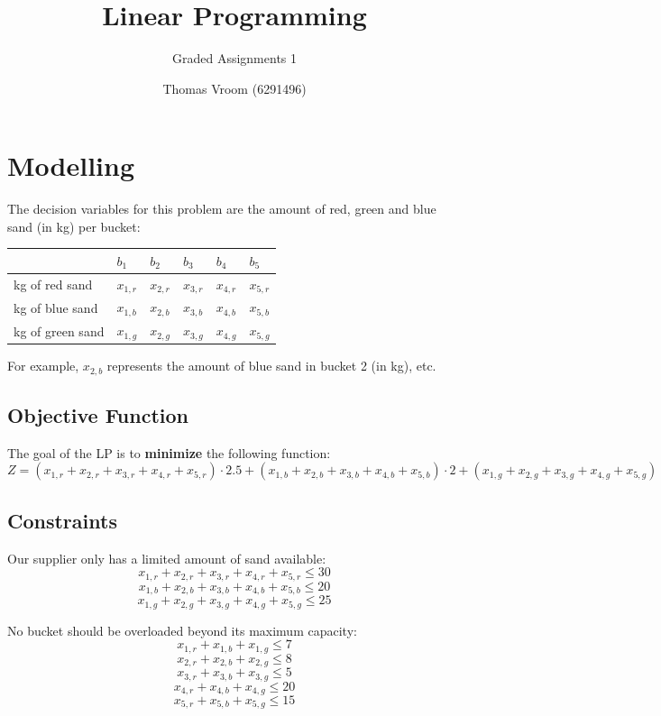 \documentclass[12pt]{article}
\title{Linear Programming}
\subtitle{Graded Assignments 1}
\author{Thomas Vroom (6291496)}
\begin{document}
\maketitle

%
%
\section{Modelling}
The decision variables for this problem are the amount of red, green and blue sand (in kg) per bucket:

\begin{table}[h]
  \centering
  \begin{tabular}{l|lllll}
   & $b_1$ & $b_2$ & $b_3$ & $b_4$ & $b_5$ \\ \hline
  kg of red sand & $x_{1,r}$ & $x_{2,r}$ & $x_{3,r}$ & $x_{4,r}$ & $x_{5,r}$ \\
  kg of blue sand & $x_{1,b}$ & $x_{2,b}$ & $x_{3,b}$ & $x_{4,b}$ & $x_{5,b}$ \\
  kg of green sand & $x_{1,g}$ & $x_{2,g}$ & $x_{3,g}$ & $x_{4,g}$ & $x_{5,g}$
  \end{tabular}
\end{table}

\noindent
For example, $x_{2,b}$ represents the amount of blue sand in bucket 2 (in kg), etc.

\subsection*{Objective Function}
The goal of the LP is to \textbf{minimize} the following function:
\[ Z = (x_{1,r} + x_{2,r} + x_{3,r} + x_{4,r} + x_{5,r}) \cdot 2.5 + (x_{1,b} + x_{2,b} + x_{3,b} + x_{4,b} + x_{5,b}) \cdot 2 + (x_{1,g} + x_{2,g} + x_{3,g} + x_{4,g} + x_{5,g}) \]

\subsection*{Constraints}
Our supplier only has a limited amount of sand available:
\[ x_{1,r} + x_{2,r} + x_{3,r} + x_{4,r} + x_{5,r} \leq 30 \]
\[ x_{1,b} + x_{2,b} + x_{3,b} + x_{4,b} + x_{5,b} \leq 20 \]
\[ x_{1,g} + x_{2,g} + x_{3,g} + x_{4,g} + x_{5,g} \leq 25 \]

\noindent
No bucket should be overloaded beyond its maximum capacity:
\[ x_{1,r} + x_{1,b} + x_{1,g} \leq 7 \]
\[ x_{2,r} + x_{2,b} + x_{2,g} \leq 8 \]
\[ x_{3,r} + x_{3,b} + x_{3,g} \leq 5 \]
\[ x_{4,r} + x_{4,b} + x_{4,g} \leq 20 \]
\[ x_{5,r} + x_{5,b} + x_{5,g} \leq 15 \]
\end{document}
